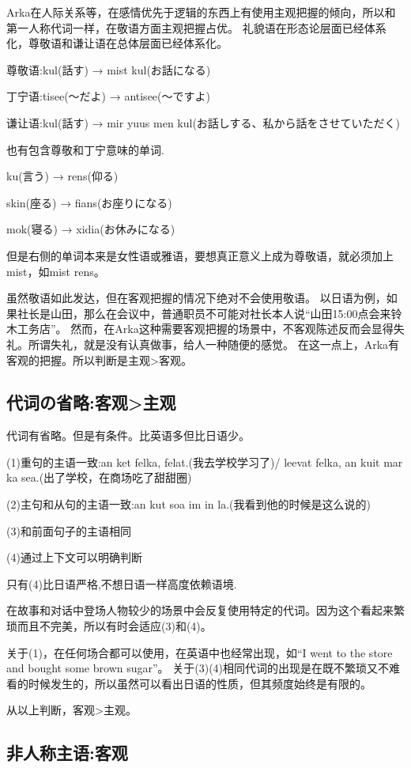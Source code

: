 Arka在人际关系等，在感情优先于逻辑的东西上有使用主观把握的倾向，所以和第一人称代词一样，在敬语方面主观把握占优。
礼貌语在形态论层面已经体系化，尊敬语和谦让语在总体层面已经体系化。
{\kaishu

尊敬语:kul(話す) → mist kul(お話になる)

丁宁语:tisee(～だよ) → antisee(～ですよ)

谦让语:kul(話す) → mir yuus men kul(お話しする、私から話をさせていただく)
}

也有包含尊敬和丁宁意味的单词.
{\kaishu

ku(言う) → rens(仰る)

skin(座る) → fians(お座りになる)

mok(寝る) → xidia(お休みになる)
}

但是右侧的单词本来是女性语或雅语，要想真正意义上成为尊敬语，就必须加上mist，如mist rens。

虽然敬语如此发达，但在客观把握的情况下绝对不会使用敬语。
以日语为例，如果社长是山田，那么在会议中，普通职员不可能对社长本人说“山田15:00点会来铃木工务店”。
然而，在Arka这种需要客观把握的场景中，不客观陈述反而会显得失礼。所谓失礼，就是没有认真做事，给人一种随便的感觉。
在这一点上，Arka有客观的把握。所以判断是主观>客观。

\subsection{代词の省略:客观>主观}

代词有省略。但是有条件。比英语多但比日语少。

(1)重句的主语一致:an ket felka, felat.(我去学校学习了)/ leevat felka, an kuit mar ka sea.(出了学校，在商场吃了甜甜圈)

(2)主句和从句的主语一致:an kut soa im in la.(我看到他的时候是这么说的)

(3)和前面句子的主语相同

(4)通过上下文可以明确判断

只有(4)比日语严格,不想日语一样高度依赖语境.

在故事和对话中登场人物较少的场景中会反复使用特定的代词。因为这个看起来繁琐而且不完美，所以有时会适应(3)和(4)。

关于(1)，在任何场合都可以使用，在英语中也经常出现，如“I went to the store and bought some brown sugar”。
关于(3)(4)相同代词的出现是在既不繁琐又不难看的时候发生的，所以虽然可以看出日语的性质，但其频度始终是有限的。

从以上判断，客观>主观。

\subsection{非人称主语:客观}

